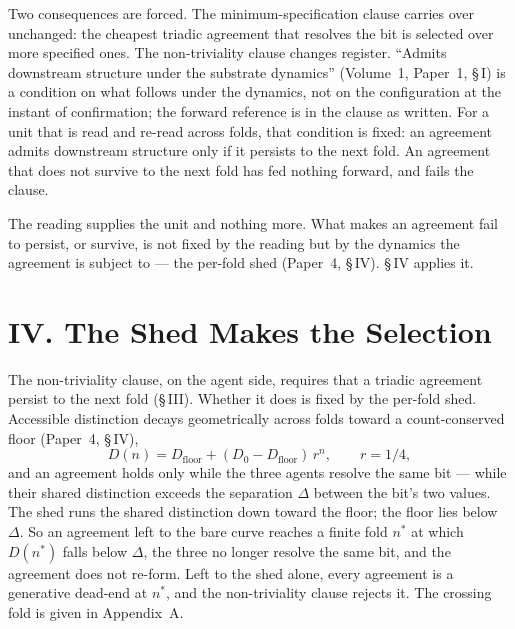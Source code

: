 \documentclass[11pt,oneside]{report}
\theoremstyle{definition}
\theoremstyle{remark}
\begin{document}
Two consequences are forced. The minimum-specification clause carries over unchanged:
the cheapest triadic agreement that resolves the bit is selected over more specified
ones. The non-triviality clause changes register. ``Admits downstream structure under
the substrate dynamics'' (Volume~1, Paper~1, \S\,I) is a condition on what follows
under the dynamics, not on the configuration at the instant of confirmation; the
forward reference is in the clause as written. For a unit that is read and re-read
across folds, that condition is fixed: an agreement admits downstream structure only
if it persists to the next fold. An agreement that does not survive to the next fold
has fed nothing forward, and fails the clause.

The reading supplies the unit and nothing more. What makes an agreement fail to
persist, or survive, is not fixed by the reading but by the dynamics the agreement is
subject to --- the per-fold shed (Paper~4, \S\,IV). \S\,IV applies it.


\section*{IV. The Shed Makes the Selection}

The non-triviality clause, on the agent side, requires that a triadic agreement
persist to the next fold (\S\,III). Whether it does is fixed by the per-fold shed.
Accessible distinction decays geometrically across folds toward a count-conserved
floor (Paper~4, \S\,IV),
\begin{equation*}
D(n) = D_{\mathrm{floor}} + (D_0 - D_{\mathrm{floor}})\,r^{n}, \qquad r = 1/4,
\end{equation*}
and an agreement holds only while the three agents resolve the same bit --- while
their shared distinction exceeds the separation \ensuremath{\Delta} between the
bit's two values. The shed runs the shared distinction down toward the floor; the
floor lies below \ensuremath{\Delta}. So an agreement left to the bare curve reaches
a finite fold \ensuremath{n^{*}} at which \ensuremath{D(n^{*})} falls below
\ensuremath{\Delta}, the three no longer resolve the same bit, and the agreement does
not re-form. Left to the shed alone, every agreement is a generative dead-end at
\ensuremath{n^{*}}, and the non-triviality clause rejects it. The crossing fold is
given in Appendix~A.
\end{document}
